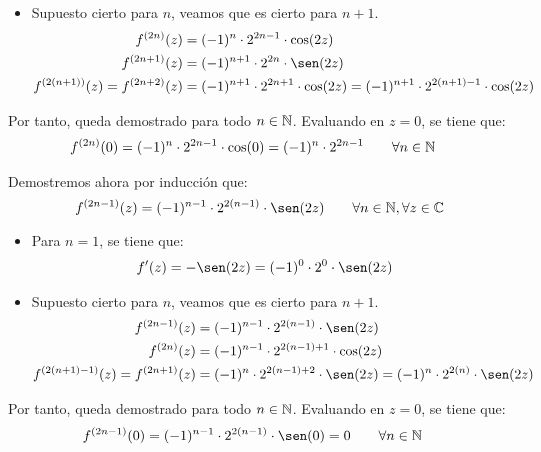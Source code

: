 \begin{ejercicio}
\begin{enumerate}
\begin{itemize}
            \item Supuesto cierto para $n$, veamos que es cierto para $n+1$.
            \begin{align*}
                f^{(2n)}(z) &= (-1)^{n}\cdot 2^{2n-1}\cdot \cos(2z)\\
                f^{(2n+1)}(z) &= (-1)^{n+1}\cdot 2^{2n}\cdot \sen(2z)\\
                f^{(2(n+1))}(z) = f^{(2n+2)}(z) &= (-1)^{n+1}\cdot 2^{2n+1}\cdot \cos(2z) = (-1)^{n+1}\cdot 2^{2(n+1)-1}\cdot \cos(2z)
            \end{align*}
        \end{itemize}

        Por tanto, queda demostrado para todo $n\in \mathbb{N}$. Evaluando en $z=0$, se tiene que:
        \begin{align*}
            f^{(2n)}(0) &= (-1)^{n}\cdot 2^{2n-1}\cdot \cos(0) = (-1)^{n}\cdot 2^{2n-1}\qquad \forall n \in \mathbb{N}
        \end{align*}

        Demostremos ahora por inducción que:
        \begin{equation*}
            f^{(2n-1)}(z) = (-1)^{n-1}\cdot 2^{2(n-1)}\cdot \sen(2z) \qquad \forall n \in \bb{N}, \forall z \in \bb{C}
        \end{equation*}
        \begin{itemize}
            \item Para $n=1$, se tiene que:
            \begin{align*}
                f'(z) &= -\sen(2z)=(-1)^0\cdot 2^0\cdot \sen(2z)
            \end{align*}

            \item Supuesto cierto para $n$, veamos que es cierto para $n+1$.
            \begin{align*}
                f^{(2n-1)}(z) &= (-1)^{n-1}\cdot 2^{2(n-1)}\cdot \sen(2z)\\
                f^{(2n)}(z) &= (-1)^{n-1}\cdot 2^{2(n-1)+1}\cdot \cos(2z)\\
                f^{(2(n+1)-1)}(z) = f^{(2n+1)}(z) &= (-1)^{n}\cdot 2^{2(n-1)+2}\cdot \sen(2z) = (-1)^{n}\cdot 2^{2(n)}\cdot \sen(2z)
            \end{align*}
        \end{itemize}

        Por tanto, queda demostrado para todo $n\in \mathbb{N}$. Evaluando en $z=0$, se tiene que:
        \begin{align*}
            f^{(2n-1)}(0) &= (-1)^{n-1}\cdot 2^{2(n-1)}\cdot \sen(0) = 0\qquad \forall n \in \bb{N}
        \end{align*}


\end{enumerate}
\end{ejercicio}
